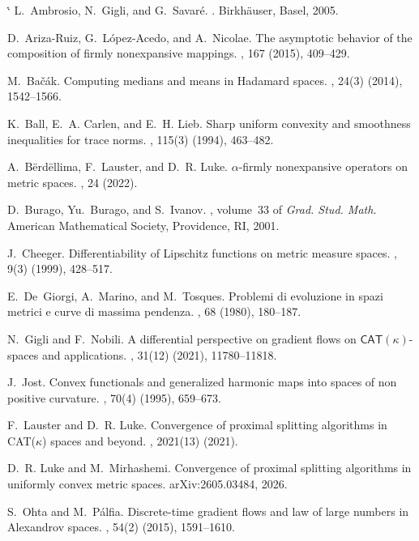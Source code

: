 \documentclass[11pt,a4paper]{article}
\makeatletter
\renewenvironment{thebibliography}[1]
  {\par\medskip{\small\bfseries\color{accent}References\par}\nopagebreak\vspace{-0.3em}%
   \small
   \list{\@biblabel{\@arabic\c@enumiv}}%
        {\settowidth\labelwidth{\@biblabel{#1}}%
         \leftmargin\labelwidth
         \advance\leftmargin\labelsep
         \itemsep 1pt \parsep 0pt \topsep 2pt
         \usecounter{enumiv}%
         \let\p@enumiv\@empty
         \renewcommand\theenumiv{\@arabic\c@enumiv}}%
   \sloppy\clubpenalty4000\widowpenalty4000\sfcode`\.\@m}
  {\def\@noitemerr{\@latex@warning{Empty `thebibliography' environment}}%
   \endlist}
\makeatother
\begin{document}
\begin{thebibliography}{99}
L.~Ambrosio, N.~Gigli, and G.~Savaré.
.
\newblock Birkhäuser, Basel, 2005.

D.~Ariza-Ruiz, G.~López-Acedo, and A.~Nicolae.
\newblock The asymptotic behavior of the composition of firmly nonexpansive mappings.
, 167 (2015), 409--429.

M.~Bačák.
\newblock Computing medians and means in Hadamard spaces.
, 24(3) (2014), 1542--1566.

K.~Ball, E.~A. Carlen, and E.~H. Lieb.
\newblock Sharp uniform convexity and smoothness inequalities for trace norms.
, 115(3) (1994), 463--482.

A.~Bërdëllima, F.~Lauster, and D.~R. Luke.
\newblock $\alpha$-firmly nonexpansive operators on metric spaces.
, 24 (2022).

D.~Burago, Yu.~Burago, and S.~Ivanov.
, volume~33 of {\em Grad. Stud. Math.}
\newblock American Mathematical Society, Providence, RI, 2001.

J.~Cheeger.
\newblock Differentiability of Lipschitz functions on metric measure spaces.
, 9(3) (1999), 428--517.

E.~De~Giorgi, A.~Marino, and M.~Tosques.
\newblock Problemi di evoluzione in spazi metrici e curve di massima pendenza.
, 68 (1980), 180--187.

N.~Gigli and F.~Nobili.
\newblock A differential perspective on gradient flows on $\mathsf{CAT}(\kappa)$-spaces and applications.
, 31(12) (2021), 11780--11818.

J.~Jost.
\newblock Convex functionals and generalized harmonic maps into spaces of non positive curvature.
, 70(4) (1995), 659--673.

F.~Lauster and D.~R. Luke.
\newblock Convergence of proximal splitting algorithms in CAT($\kappa$) spaces and beyond.
, 2021(13) (2021).

D.~R. Luke and M.~Mirhashemi.
\newblock Convergence of proximal splitting algorithms in uniformly convex metric spaces.
\newblock arXiv:2605.03484, 2026.

S.~Ohta and M.~Pálfia.
\newblock Discrete-time gradient flows and law of large numbers in Alexandrov spaces.
, 54(2) (2015), 1591--1610.
\end{thebibliography}
\end{document}
